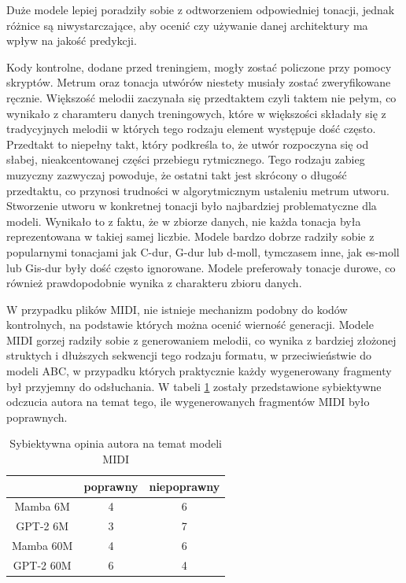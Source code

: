 \documentclass[data-science]{agh-wi} %
\begin{document}
Duże modele lepiej poradziły sobie z odtworzeniem odpowiedniej tonacji, jednak różnice są niwystarczające, aby ocenić czy używanie danej architektury ma wpływ na jakość predykcji.

Kody kontrolne, dodane przed treningiem, mogły zostać policzone przy pomocy skryptów. Metrum oraz tonacja utwórów niestety musiały zostać zweryfikowane ręcznie. Większość melodii zaczynała się przedtaktem czyli taktem nie pełym, co wynikało z charamteru danych treningowych, które w większości składały się z tradycyjnych melodii w których tego rodzaju element występuje dość często. Przedtakt to niepełny takt, który podkreśla to, że utwór rozpoczyna się od słabej, nieakcentowanej części przebiegu rytmicznego. Tego rodzaju zabieg muzyczny zazwyczaj powoduje, że ostatni takt jest skrócony o długość przedtaktu, co przynosi trudności w algorytmicznym ustaleniu metrum utworu. Stworzenie utworu w konkretnej tonacji było najbardziej problematyczne dla modeli. Wynikało to z faktu, że w zbiorze danych, nie każda tonacja była reprezentowana w takiej samej liczbie. Modele bardzo dobrze radziły sobie z popularnymi tonacjami jak C-dur, G-dur lub d-moll, tymczasem inne, jak es-moll lub Gis-dur były dość często ignorowane. Modele preferowały tonacje durowe, co również prawdopodobnie wynika z charakteru zbioru danych.

W przypadku plików MIDI, nie istnieje mechanizm podobny do kodów kontrolnych, na podstawie których można ocenić wierność generacji. Modele MIDI gorzej radziły sobie z generowaniem melodii, co wynika z bardziej złożonej struktych i dłuższych sekwencji tego rodzaju formatu, w przeciwieństwie do modeli ABC, w przypadku których praktycznie każdy wygenerowany fragmenty był przyjemny do odsłuchania. W tabeli \ref*{tab:midi_gen} zostały przedstawione sybiektywne odczucia autora na temat tego, ile wygenerowanych fragmentów MIDI było poprawnych.

\begin{table}[ht!]
    \centering
    \begin{tabular}{|c|c|c|}
    \hline
              & poprawny & niepoprawny \\ \hline
    Mamba 6M  & 4        & 6           \\ \hline
    GPT-2 6M  & 3        & 7           \\ \hline
    Mamba 60M & 4        & 6           \\ \hline
    GPT-2 60M & 6        & 4           \\ \hline
    \end{tabular}
    \caption{Sybiektywna opinia autora na temat modeli MIDI}\label{tab:midi_gen}
\end{table}
\end{document}
